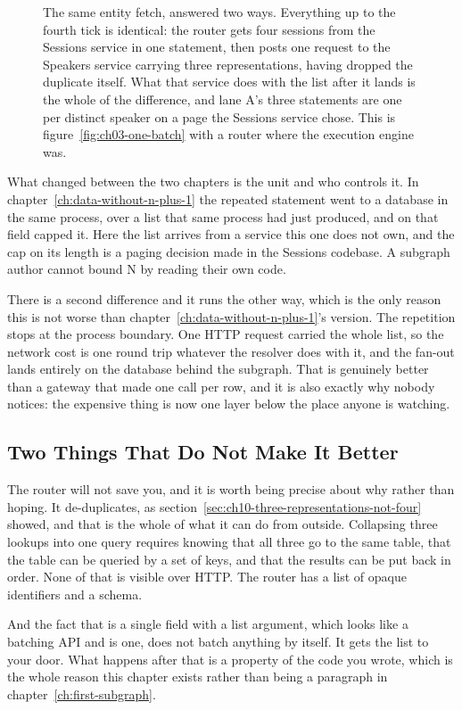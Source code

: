 \begin{figure}[htbp]
  \centering
  
  \caption{The same entity fetch, answered two ways. Everything up to the
  fourth tick is identical: the router gets four sessions from the Sessions
  service in one statement, then posts one request to the Speakers service
  carrying three representations, having dropped the duplicate itself. What
  that service does with the list after it lands is the whole of the
  difference, and lane A's three statements are one per distinct speaker on a
  page the Sessions service chose. This is
  figure~\ref{fig:ch03-one-batch} with a router where the execution engine was.}
  \label{fig:ch10-one-fetch-two-costs}
\end{figure}

%
What changed between the two chapters is the unit and who controls it. In
chapter~\ref{ch:data-without-n-plus-1} the repeated statement went to a database
in the same process, over a list that same process had just produced, and
\code{[UsePaging]} on that field capped it. Here the list arrives from a service
this one does not own, and the cap on its length is a paging decision made in
the Sessions codebase. A subgraph author cannot bound N by reading their own
code.

%
There is a second difference and it runs the other way, which is the only
reason this is not worse than chapter~\ref{ch:data-without-n-plus-1}'s version.
The repetition stops at the process boundary. One HTTP request carried the
whole list, so the network cost is one round trip whatever the resolver does
with it, and the fan-out lands entirely on the database behind the subgraph.
That is genuinely better than a gateway that made one call per row, and it is
also exactly why nobody notices: the expensive thing is now one layer below the
place anyone is watching.

\subsection{Two Things That Do Not Make It Better}

%
The router will not save you, and it is worth being precise about why rather
than hoping. It de-duplicates, as section~\ref{sec:ch10-three-representations-not-four}
showed, and that is the whole of what it can do from outside. Collapsing three
lookups into one query requires knowing that all three go to the same table,
that the table can be queried by a set of keys, and that the results can be put
back in order. None of that is visible over HTTP. The router has a list of
opaque identifiers and a schema.

%
And the fact that  is a single field with a list argument, which
looks like a batching API and is one, does not batch anything by itself. It gets
the list to your door. What happens after that is a property of the code you
wrote, which is the whole reason this chapter exists rather than being a
paragraph in chapter~\ref{ch:first-subgraph}.
%
